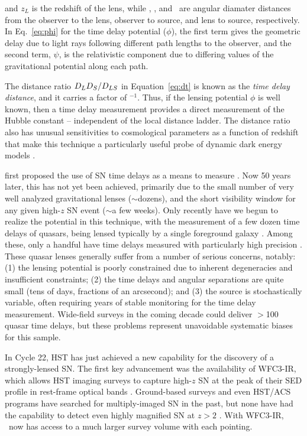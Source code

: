 \noindent and $z_L$ is the redshift of the lens, while \Dl, \Ds, 
and \Dls\ are angular diamater distances from the observer to the
lens, observer to source, and lens to source, respectively.  In
Eq.~\ref{eq:phi} for the time delay potential  ($\phi$), the first
term gives the geometric delay due to light rays following different
path lengths to the observer, and the second term, $\psi$, is the
relativistic component due to differing values of the gravitational
potential along each path.

The distance ratio $D_LD_S/D_{LS}$ in Equation~\ref{eq:dt} is known as
the {\em time delay distance}, and it carries a factor
of \Ho$^{-1}$. Thus, if the lensing potential $\phi$ is well known,
then a time delay measurement provides a direct measurement of the
Hubble constant -- independent of the local distance ladder.  The
distance ratio also has unusual sensitivities to cosmological
parameters as a function of redshift that make this technique a
particularly useful probe of dynamic dark energy
models \citep{Linder:2011}.

\citet{Refsdal:1964} first proposed the use of SN time delays as 
a means to measure \Ho.  Now 50 years later, this has not yet been
achieved, primarily due to the small number of very well analyzed
gravitational lenses ($\sim$dozens), and the short visibility window
for any given high-$z$ SN event ($\sim$a few weeks).  Only recently
have we begun to realize the potential in this technique, with the
measurement of a few dozen time delays of quasars, being lensed
typically by a single foreground galaxy \citep{Jackson:2007}. Among
these, only a handful have time delays measured with particularly high
precision \citep[e.g.][]{Suyu:2010,Suyu:2013}.  These quasar lenses
generally suffer from a number of serious concerns, notably: (1) the
lensing potential is poorly constrained due to inherent degeneracies
and insufficient constraints; (2) the time delays and angular
separations are quite small (tens of days, fractions of an arcsecond);
and (3) the source is stochastically variable, often requiring years of
stable monitoring for the time delay measurement.  Wide-field surveys
in the coming decade could deliver $>$100 quasar time delays, but
these problems represent unavoidable systematic biases for this
sample.

\medskip
{}
 
In Cycle 22, HST has just achieved a new capability for the discovery
of a strongly-lensed SN. The first key advancement was the
availability of WFC3-IR, which allows HST imaging surveys to capture
high-$z$ SN at the peak of their SED profile in rest-frame optical
bands \citep{Rodney:2012,Jones:2013}.  Ground-based surveys and even
HST/ACS programs have searched for multiply-imaged SN in the past, but
none have had the capability to detect even highly magnified SN at
$z>2$ \citep[e.g.][]{Dawson:2009,Sand:2011}.  With WFC3-IR, \Hubble\
now has access to a much larger survey volume with each pointing.

